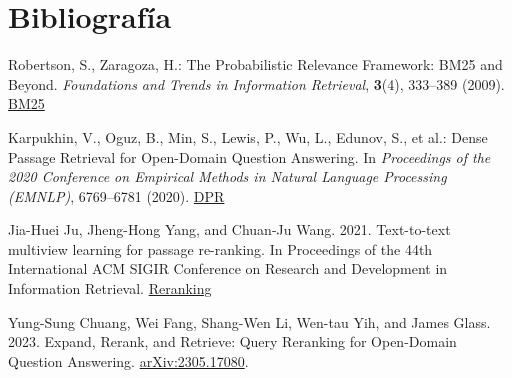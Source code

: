 \documentclass[runningheads]{llncs}
\begin{document}
\section{Bibliografía}
\begin{thebibliography}{8}

Robertson, S., Zaragoza, H.: The Probabilistic Relevance Framework: BM25 and Beyond. \emph{Foundations and Trends in Information Retrieval}, \textbf{3}(4), 333--389 (2009). \href{https://www.researchgate.net/publication/220613776_The_Probabilistic_Relevance_Framework_BM25_and_Beyond}{BM25}

Karpukhin, V., Oguz, B., Min, S., Lewis, P., Wu, L., Edunov, S., et al.: Dense Passage Retrieval for Open-Domain Question Answering. In \emph{Proceedings of the 2020 Conference on Empirical Methods in Natural Language Processing (EMNLP)}, 6769--6781 (2020). \href{https://arxiv.org/abs/2004.04906}{DPR}

Jia-Huei Ju, Jheng-Hong Yang, and Chuan-Ju Wang. 2021. Text-to-text multiview learning for passage re-ranking. In Proceedings of the 44th International ACM SIGIR Conference on Research and Development in Information Retrieval. \href{https://arxiv.org/abs/2104.14133}{Reranking}

Yung-Sung Chuang, Wei Fang, Shang-Wen Li, Wen-tau Yih, and James Glass. 2023. Expand, Rerank, and Retrieve: Query Reranking for Open-Domain Question Answering. \href{https://arxiv.org/abs/2305.17080}{arXiv:2305.17080}.



\end{thebibliography}
\end{document}
